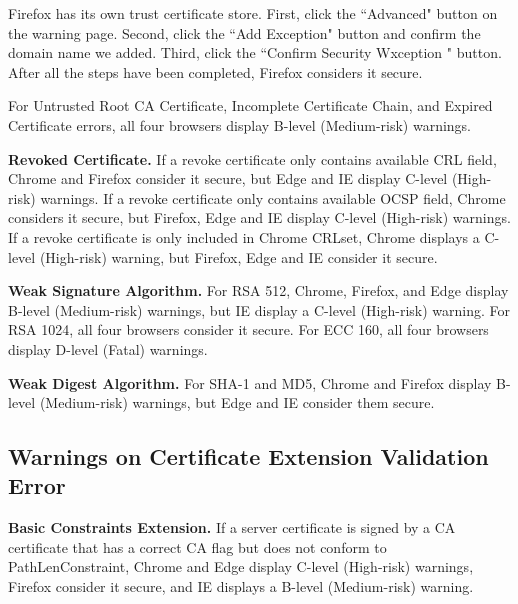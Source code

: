    Firefox has its own trust certificate store.
   First, click the ``Advanced" button on the warning page.
   Second, click the ``Add Exception" button and confirm the domain name we added.
   Third, click the ``Confirm Security Wxception " button.
   After all the steps have been completed, Firefox considers it secure.


    For Untrusted Root CA Certificate, Incomplete Certificate Chain, and Expired Certificate errors,
        all four browsers display B-level (Medium-risk) warnings.

\textbf{Revoked Certificate.}
    If a revoke certificate only contains available CRL field,
        Chrome and Firefox consider it secure,
            but Edge and IE display C-level (High-risk) warnings.
    If a revoke certificate only contains available OCSP field,
        Chrome considers it secure, but Firefox,
            Edge and IE display C-level (High-risk) warnings.
    If a revoke certificate is only included in Chrome CRLset,
        Chrome displays a C-level (High-risk) warning,
            but Firefox, Edge and IE consider it secure.

\textbf{Weak Signature Algorithm.}
    For RSA 512,
        Chrome, Firefox, and Edge display B-level (Medium-risk) warnings,
            but IE display a C-level (High-risk) warning.
    For RSA 1024,
        all four browsers consider it secure.
    For ECC 160,
        all four browsers display D-level (Fatal) warnings.

\textbf{Weak Digest Algorithm.}
    For SHA-1 and MD5,
        Chrome and Firefox display B-level (Medium-risk) warnings,
            but Edge and IE consider them secure.

\subsection{Warnings on Certificate Extension Validation Error}

\textbf{Basic Constraints Extension.}
    If a server certificate is signed by a CA certificate that has a correct CA flag but does not conform to PathLenConstraint,
    Chrome and Edge display C-level (High-risk) warnings,
    Firefox consider it secure, and IE displays a B-level (Medium-risk) warning.

